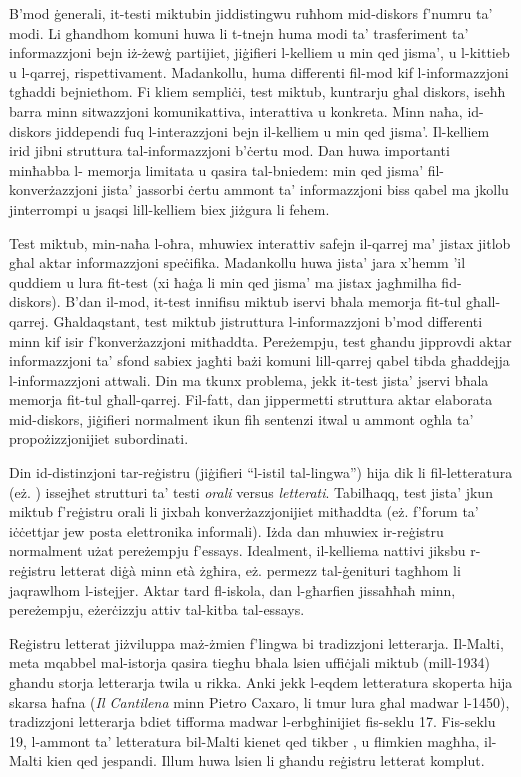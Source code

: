 \documentclass[]{../../metanetpaper}
\begin{document}
\begin{multicols}{2}
B’mod ġenerali, it-testi miktubin jiddistingwu ruħhom mid-diskors f’numru ta’ modi. Li għandhom komuni huwa li t-tnejn huma modi ta’ trasferiment ta’ informazzjoni bejn iż-żewġ partijiet, jiġifieri l-kelliem u min qed jisma’, u l-kittieb u l-qarrej, rispettivament. Madankollu, huma differenti fil-mod kif l-informazzjoni tgħaddi bejniethom. Fi kliem sempliċi, test miktub, kuntrarju għal diskors, iseħħ barra minn sitwazzjoni komunikattiva, interattiva u konkreta. Minn naħa, id-diskors jiddependi fuq l-interazzjoni bejn il-kelliem u min qed jisma’. Il-kelliem irid jibni struttura tal-informazzjoni b’ċertu mod. Dan huwa importanti minħabba l- memorja limitata u qasira tal-bniedem: min qed jisma’ fil-konverżazzjoni jista’ jassorbi ċertu ammont ta’ informazzjoni biss qabel ma jkollu jinterrompi u jsaqsi lill-kelliem biex jiżgura li fehem.

Test miktub, min-naħa l-oħra, mhuwiex interattiv safejn il-qarrej ma’ jistax jitlob għal aktar informazzjoni speċifika. Madankollu huwa jista’ jara x'hemm 'il quddiem u lura fit-test (xi ħaġa li min qed jisma’ ma jistax jagħmilha fid-diskors). B'dan il-mod, it-test innifisu miktub iservi bħala memorja fit-tul għall-qarrej. Għaldaqstant, test miktub jistruttura l-informazzjoni b’mod differenti minn kif isir f’konverżazzjoni mitħaddta. Pereżempju, test għandu jipprovdi aktar informazzjoni ta’ sfond sabiex jagħti bażi komuni lill-qarrej qabel tibda għaddejja l-informazzjoni attwali. Din ma tkunx problema, jekk it-test jista’ jservi bħala memorja fit-tul għall-qarrej. Fil-fatt, dan jippermetti struttura aktar elaborata mid-diskors, jiġifieri normalment ikun fih sentenzi itwal u ammont ogħla ta’ propożizzjonijiet subordinati.

Din id-distinzjoni tar-reġistru (jiġifieri ``l-istil tal-lingwa'') hija dik li fil-letteratura (eż. \cite{Biber:1991}) issejħet strutturi ta’ testi \emph{orali} versus \emph{letterati}. Tabilħaqq, test jista’ jkun miktub f'reġistru orali li jixbah konverżazzjonijiet mitħaddta (eż. f’forum ta’ iċċettjar jew posta elettronika informali). Iżda dan mhuwiex ir-reġistru normalment użat pereżempju f'essays. Idealment, il-kelliema nattivi jiksbu r-reġistru letterat diġà minn età żgħira, eż. permezz tal-ġenituri tagħhom li jaqrawlhom l-istejjer. Aktar tard fl-iskola, dan l-għarfien jissaħħaħ minn, pereżempju, eżerċizzju attiv tal-kitba tal-essays.

Reġistru letterat jiżviluppa maż-żmien f’lingwa bi tradizzjoni letterarja. Il-Malti, meta mqabbel mal-istorja qasira tiegħu bħala lsien uffiċjali miktub (mill-1934) għandu storja letterarja twila u rikka. Anki jekk l-eqdem letteratura skoperta hija skarsa ħafna (\emph{Il Cantilena} minn Pietro Caxaro, li tmur lura għal madwar l-1450), tradizzjoni letterarja bdiet tifforma madwar l-erbgħinijiet fis-seklu 17. Fis-seklu 19, l-ammont ta’ letteratura bil-Malti kienet qed tikber \cite{Fabri:2011a}, u flimkien magħha, il-Malti kien qed jespandi. Illum huwa lsien li għandu reġistru letterat komplut.


\end{multicols}
\end{document}
